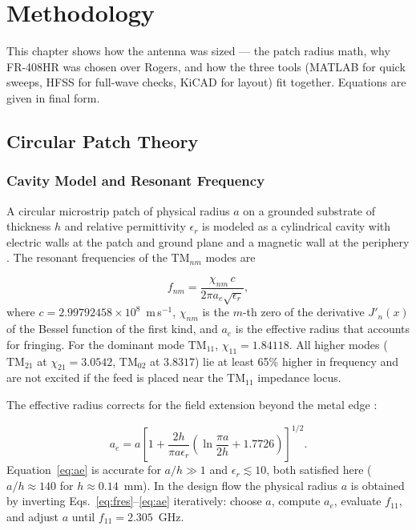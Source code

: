 %
%
%
%

\chapter{Methodology}

This chapter shows how the antenna was sized — the patch radius math, why FR-408HR was chosen over Rogers, and how the three tools (MATLAB for quick sweeps, HFSS for full-wave checks, KiCAD for layout) fit together. Equations are given in final form.

\section{Circular Patch Theory}

\subsection{Cavity Model and Resonant Frequency}

A circular microstrip patch of physical radius $a$ on a grounded substrate of thickness $h$ and relative permittivity $\epsilon_r$ is modeled as a cylindrical cavity with electric walls at the patch and ground plane and a magnetic wall at the periphery \cite{balanis2005antenna, garg2001microstrip}. The resonant frequencies of the $\mathrm{TM}_{nm}$ modes are

\begin{equation}
    f_{nm} = \frac{\chi_{nm} \, c}{2\pi a_e \sqrt{\epsilon_r}} ,
    \label{eq:fres}
\end{equation}
where $c = 2.99792458\times10^{8}$~m\,s$^{-1}$, $\chi_{nm}$ is the $m$-th zero of the derivative $J'_n(x)$ of the Bessel function of the first kind, and $a_e$ is the effective radius that accounts for fringing. For the dominant mode $\mathrm{TM}_{11}$, $\chi_{11}=1.84118$. All higher modes ($\mathrm{TM}_{21}$ at $\chi_{21}=3.0542$, $\mathrm{TM}_{02}$ at $3.8317$) lie at least 65\% higher in frequency and are not excited if the feed is placed near the $\mathrm{TM}_{11}$ impedance locus.

The effective radius corrects for the field extension beyond the metal edge \cite{shen1979resonant, hammerstad1975equations}:

\begin{equation}
    a_e = a \left[ 1 + \frac{2h}{\pi a \epsilon_r}\left( \ln\frac{\pi a}{2h} + 1.7726 \right) \right]^{1/2} .
    \label{eq:ae}
\end{equation}
Equation~\ref{eq:ae} is accurate for $a/h \gg 1$ and $ \epsilon_r \lesssim 10$, both satisfied here ($a/h \approx 140$ for $h\approx 0.14$~mm). In the design flow the physical radius $a$ is obtained by inverting Eqs.~\ref{eq:fres}--\ref{eq:ae} iteratively: choose $a$, compute $a_e$, evaluate $f_{11}$, and adjust $a$ until $f_{11}=2.305$~GHz.

